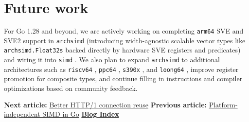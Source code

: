 \documentclass[11pt,a4paper]{article}
\begin{document}
\section{Future work}

For Go 1.28 and beyond, we are actively working on completing \texttt{arm64} SVE and SVE2 support in \texttt{archsimd} (introducing width-agnostic scalable vector types like \texttt{archsimd.Float32s} backed directly by hardware SVE registers and predicates) and wiring it into \texttt{simd} . We also plan to expand \texttt{archsimd} to additional architectures such as \texttt{riscv64} , \texttt{ppc64} , \texttt{s390x} , and \texttt{loong64} , improve register promotion for composite types, and continue filling in instructions and compiler optimizations based on community feedback.

\textbf{Next article:} \href{https://go.dev/blog/http-connection-reuse}{Better HTTP/1 connection reuse} \textbf{Previous article:} \href{https://go.dev/blog/simd-experiment}{Platform-independent SIMD in Go} \href{https://go.dev/blog/all}{\textbf{Blog Index}}
\end{document}
